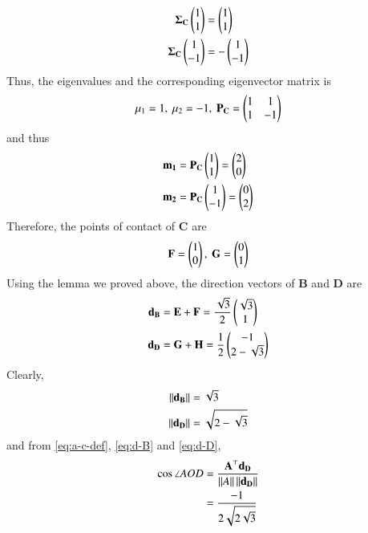 \documentclass[journal,12pt,twocolumn]{IEEEtran}
\renewcommand{\vec}[1]{\boldsymbol{\mathbf{#1}}}
\begin{document}
\begin{enumerate}
\begin{align}
        \vec{\Sigma_C}\myvec{1\\1} &= \myvec{1\\1} \\
        \vec{\Sigma_C}\myvec{1\\-1} &= -\myvec{1\\-1} \\
    \end{align}
    Thus, the eigenvalues and the corresponding eigenvector
    matrix is
    \begin{align}
        \mu_1 = 1,\ \mu_2 = -1,\ \vec{P_C} = \myvec{1&1\\1&-1}
    \end{align}
    and thus
    \begin{align}
        \vec{m_1} &= \vec{P_C}\myvec{1\\1} = \myvec{2\\0} \\ 
        \vec{m_2} &= \vec{P_C}\myvec{1\\-1} = \myvec{0\\2}
    \end{align}
    Therefore, the points of contact of $\vec{C}$ are
    \begin{align}
        \vec{F} = \myvec{1\\0},\ \vec{G} = \myvec{0\\1}
        \label{eq:poc-fg}
    \end{align}
    Using the lemma we proved above, the direction vectors of $\vec{B}$ and 
    $\vec{D}$ are
    \begin{align}
        \vec{d_B} &= \vec{E} + \vec{F} = \frac{\sqrt{3}}{2}\myvec{\sqrt{3}\\1} \label{eq:d-B} \\
        \vec{d_D} &= \vec{G} + \vec{H} = \frac{1}{2}\myvec{-1\\2-\sqrt{3}} \label{eq:d-D}
    \end{align}
    Clearly,
    \begin{align}
        \norm{\vec{d_B}} &= \sqrt{3} \\
        \norm{\vec{d_D}} &= \sqrt{2-\sqrt{3}}
        \label{eq:norm-d}
    \end{align}
    and from \eqref{eq:a-c-def}, \eqref{eq:d-B} and \eqref{eq:d-D},
    \begin{align}
        \cos\angle AOD &= \frac{\vec{A}^\top\vec{d_D}}{\norm{A}\norm{\vec{d_D}}} \\
                       &= \frac{-1}{2\sqrt{2\sqrt{3}}} \\

\end{align}
\end{enumerate}
\end{document}
